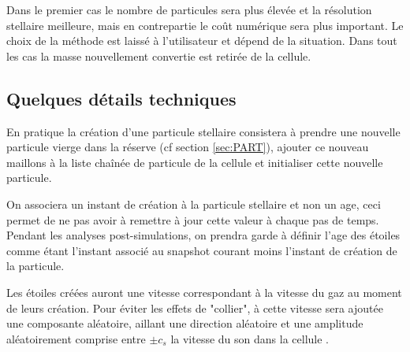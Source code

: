 Dans le premier cas le nombre de particules sera plus élevée et la résolution stellaire meilleure, mais en contrepartie le coût numérique sera plus important.
Le choix de la méthode est laissé à l'utilisateur et dépend de la situation.
Dans tout les cas la masse nouvellement convertie est retirée de la cellule.




\subsection{Quelques détails techniques}

En pratique la création d'une particule stellaire consistera à prendre une nouvelle particule vierge dans la réserve (cf section \ref{sec:PART}), ajouter ce nouveau maillons à la liste chaînée de particule de la cellule et initialiser cette nouvelle particule.

On associera un instant de création à la particule stellaire et non un age, ceci permet de ne pas avoir à remettre à jour cette valeur à chaque pas de temps.
Pendant les analyses post-simulations, on prendra garde à définir l'age des étoiles comme étant l'instant associé au snapshot courant moins l'instant de création de la particule.

Les étoiles créées auront une vitesse correspondant à la vitesse du gaz au moment de leurs création.
Pour éviter les effets de "collier", à cette vitesse sera ajoutée une composante aléatoire, aillant une direction aléatoire et une amplitude aléatoirement comprise entre $\pm c_s$ la vitesse du son dans la cellule \citep{rasera_history_2006}.

